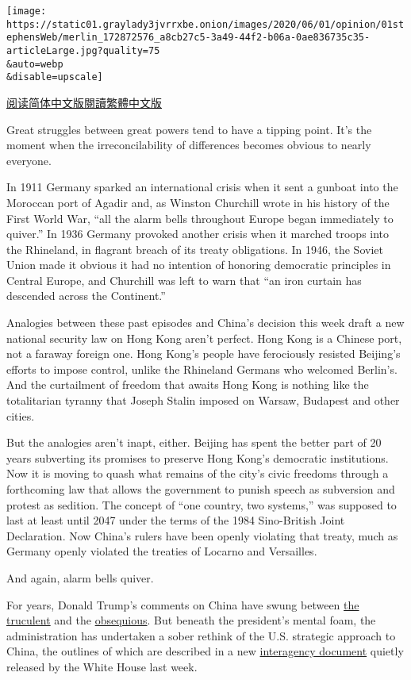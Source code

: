\texttt{[image: https://static01.graylady3jvrrxbe.onion/images/2020/06/01/opinion/01stephensWeb/merlin\_172872576\_a8cb27c5-3a49-44f2-b06a-0ae836735c35-articleLarge.jpg?quality=75\\\&auto=webp\\\&disable=upscale]}

\href{https://cn.nytimes3xbfgragh.onion/opinion/20200604/china-hong-kong/}{阅读简体中文版}\href{https://cn.nytimes3xbfgragh.onion/opinion/20200604/china-hong-kong/zh-hant/}{閱讀繁體中文版}

Great struggles between great powers tend to have a tipping point. It's
the moment when the irreconcilability of differences becomes obvious to
nearly everyone.

In 1911 Germany sparked an international crisis when it sent a gunboat
into the Moroccan port of Agadir and, as Winston Churchill wrote in his
history of the First World War, ``all the alarm bells throughout Europe
began immediately to quiver.'' In 1936 Germany provoked another crisis
when it marched troops into the Rhineland, in flagrant breach of its
treaty obligations. In 1946, the Soviet Union made it obvious it had no
intention of honoring democratic principles in Central Europe, and
Churchill was left to warn that ``an iron curtain has descended across
the Continent.''

Analogies between these past episodes and China's decision this week
draft a new national security law on Hong Kong aren't perfect. Hong Kong
is a Chinese port, not a faraway foreign one. Hong Kong's people have
ferociously resisted Beijing's efforts to impose control, unlike the
Rhineland Germans who welcomed Berlin's. And the curtailment of freedom
that awaits Hong Kong is nothing like the totalitarian tyranny that
Joseph Stalin imposed on Warsaw, Budapest and other cities.

But the analogies aren't inapt, either. Beijing has spent the better
part of 20 years subverting its promises to preserve Hong Kong's
democratic institutions. Now it is moving to quash what remains of the
city's civic freedoms through a forthcoming law that allows the
government to punish speech as subversion and protest as sedition. The
concept of ``one country, two systems,'' was supposed to last at least
until 2047 under the terms of the 1984 Sino-British Joint Declaration.
Now China's rulers have been openly violating that treaty, much as
Germany openly violated the treaties of Locarno and Versailles.

And again, alarm bells quiver.

For years, Donald Trump's comments on China have swung between
\href{https://www.politico.eu/article/trump-seizes-a-new-cudgel-to-bash-china-taiwan/}{the
truculent} and the
\href{https://www.politico.com/news/2020/04/15/trump-china-coronavirus-188736}{obsequious}.
But beneath the president's mental foam, the administration has
undertaken a sober rethink of the U.S. strategic approach to China, the
outlines of which are described in a new
\href{https://www.whitehouse.gov/wp-content/uploads/2020/05/U.S.-Strategic-Approach-to-The-Peoples-Republic-of-China-Report-5.24v1.pdf}{interagency
document} quietly released by the White House last week.

